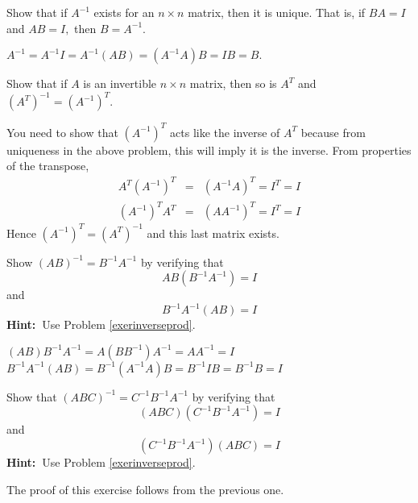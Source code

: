 \begin{enumialphparenastyle}
\begin{ex}\label{exerinverseprod}Show that if $A^{-1}$ exists for an $n\times n$
matrix, then it is unique. That is, if $BA=I$ and $AB=I,$ then $B=A^{-1}.$ 
\begin{sol}
 $A^{-1}=A^{-1}I=A^{-1}\left( AB\right) =\left( A^{-1}A\right) B=IB=B.$
\end{sol}
\end{ex}

\begin{ex}Show that if $A$ is an invertible $n\times n$ matrix, then so is 
$A^{T} $ and $\left( A^{T}\right) ^{-1}=\left( A^{-1}\right) ^{T}.$ 
\begin{sol}
 You need to show that $\left( A^{-1}\right) ^{T}$ acts like the inverse of $A^{T}
$ because from uniqueness in the above problem, this will imply it is the
inverse. From properties of the transpose,
\begin{eqnarray*}
A^{T}\left( A^{-1}\right) ^{T} &=&\left( A^{-1}A\right) ^{T}=I^{T}=I \\
\left( A^{-1}\right) ^{T}A^{T} &=&\left( AA^{-1}\right) ^{T}=I^{T}=I
\end{eqnarray*}
Hence $\left( A^{-1}\right) ^{T}=\left( A^{T}\right) ^{-1}$ and this last
matrix exists.
\end{sol}
\end{ex}

\begin{ex}Show $\left( AB\right) ^{-1}=B^{-1}A^{-1}$ by verifying that 
\begin{equation*}
AB\left(
B^{-1}A^{-1}\right) =I
\end{equation*} and 
\begin{equation*}
B^{-1}A^{-1}\left( AB\right) =I
\end{equation*}
\textbf{Hint:\ }Use Problem \ref{exerinverseprod}.
\begin{sol}
$\left( AB\right)
B^{-1}A^{-1}=A\left( BB^{-1}\right) A^{-1}=AA^{-1}=I$ $B^{-1}A^{-1}\left(
AB\right) =B^{-1}\left( A^{-1}A\right) B=B^{-1}IB=B^{-1}B=I$
\end{sol}
\end{ex}

\begin{ex}Show that $\left( ABC\right) ^{-1}=C^{-1}B^{-1}A^{-1}$ by verifying
that 
\[
\left( ABC\right) \left( C^{-1}B^{-1}A^{-1}\right) =I
\]
and 
\[\left( C^{-1}B^{-1}A^{-1}\right)\left( ABC\right) =I
\] 
\textbf{Hint:\ }Use Problem \ref{exerinverseprod}. 
\begin{sol}
The proof of this exercise follows from the previous one.
\end{sol}
\end{ex}


\end{enumialphparenastyle}
